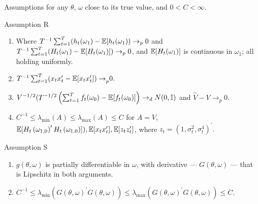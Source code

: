 \documentclass[smaller, aspectratio=169]{beamer}
\begin{document}
\begin{frame}[c]{Assumptions for any $\theta$, $\omega$ close to its true value, and $ 0 < C < \infty$.}

  \begin{block}{Assumption R}
    \label{assump:R}
%    
    \begin{enumerate}
      \item Where $T^{-1}\sum_{t=1}^{T}(h_{t}(\omega_{1})-\mathbb{E}[ h_{t}(\omega_{1}))\rightarrow_{p}0$ and $T^{-1}\sum_{t=1}^{T}(H_{t}(\omega_{1})-\mathbb{E}[H_{t}(\omega_{1})])\rightarrow_{p}0$, and $\mathbb{E}[H_{t}(\omega_{1})]$ is continuous in $\omega_{1}$; all holding uniformly.
%
      \item $T^{-1}\sum_{t=1}^{T}(x_{t}x_{t}^{\prime}-\mathbb{E}[ x_{t}x_{t}^{\prime}{])\rightarrow}_{p}0.$
%
      \item $V^{-1/2} (T^{-1/2}\left(\sum_{t=1}^{T}f_{t}(\omega_{0})-\mathbb{E}[f_{t}(\omega_{0})]\right) \rightarrow_{d} N(0, \mathbb{I})$ and $\widehat{V} -V\rightarrow_{p}0.$
%
      \item $C^{-1}\leq \lambda_{\min}(A)\leq \lambda_{\max}(A)\leq C$ for $A = V$, $\mathbb{E}[H_{t}\left(\omega_{1, 0}\right)^{\prime}H_{t}\left(\omega_{1, 0}\right) ]), \mathbb{E}[x_{t}x_{t}^{\prime}], \mathbb{E}[ z_{t}z_{t}^{\prime}]$, where $z_{t} = (1, \sigma_{t}^{2}, \sigma_{t}^{4})^{\prime}.$
%
    \end{enumerate}
  \end{block}
  
  \vfill

  \begin{block}{Assumption S}
%
    \begin{enumerate}
      \item $g(\theta, \omega)$ is partially differentiable in $\omega$, with derivative --- $G(\theta, \omega)$ --- that is Lipschitz in both arguments. 
      \item $C^{-1} \leq \lambda_{\min}(G(\theta, \omega)^{\prime}G(\theta, \omega)) \leq \lambda_{\max}(G(\theta, \omega)^{\prime}G(\theta, \omega)) \leq C$.
    \end{enumerate}

  \end{block}

\end{frame}
\end{document}
